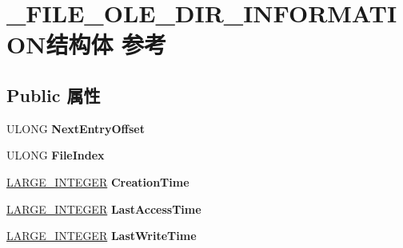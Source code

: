\hypertarget{struct___f_i_l_e___o_l_e___d_i_r___i_n_f_o_r_m_a_t_i_o_n}{}\section{\+\_\+\+F\+I\+L\+E\+\_\+\+O\+L\+E\+\_\+\+D\+I\+R\+\_\+\+I\+N\+F\+O\+R\+M\+A\+T\+I\+O\+N结构体 参考}
\label{struct___f_i_l_e___o_l_e___d_i_r___i_n_f_o_r_m_a_t_i_o_n}
\subsection*{Public 属性}
\begin{DoxyCompactItemize}
\item 
\mbox{\label{struct___f_i_l_e___o_l_e___d_i_r___i_n_f_o_r_m_a_t_i_o_n_ad5174c5e72962908777e81912f2e0ff4}} 
U\+L\+O\+NG {\bfseries Next\+Entry\+Offset}
\item 
\mbox{\label{struct___f_i_l_e___o_l_e___d_i_r___i_n_f_o_r_m_a_t_i_o_n_a87cecd73dbf7d2b498f36fcb7172dc5e}} 
U\+L\+O\+NG {\bfseries File\+Index}
\item 
\mbox{\label{struct___f_i_l_e___o_l_e___d_i_r___i_n_f_o_r_m_a_t_i_o_n_a2fa5e6c03d1480f00aa1c83f0a74cf63}} 
\hyperlink{union___l_a_r_g_e___i_n_t_e_g_e_r}{L\+A\+R\+G\+E\+\_\+\+I\+N\+T\+E\+G\+ER} {\bfseries Creation\+Time}
\item 
\mbox{\label{struct___f_i_l_e___o_l_e___d_i_r___i_n_f_o_r_m_a_t_i_o_n_a21caca8335e2e6ce10d85e30aba8cb54}} 
\hyperlink{union___l_a_r_g_e___i_n_t_e_g_e_r}{L\+A\+R\+G\+E\+\_\+\+I\+N\+T\+E\+G\+ER} {\bfseries Last\+Access\+Time}
\item 
\mbox{\label{struct___f_i_l_e___o_l_e___d_i_r___i_n_f_o_r_m_a_t_i_o_n_aef8a2edf90e95ad39a2705282e7dc307}} 
\hyperlink{union___l_a_r_g_e___i_n_t_e_g_e_r}{L\+A\+R\+G\+E\+\_\+\+I\+N\+T\+E\+G\+ER} {\bfseries Last\+Write\+Time}
\item 

\end{DoxyCompactItemize}
